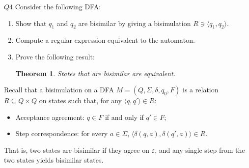 \documentclass{article}
\newtheorem*{theorem*}{Theorem}
\theoremstyle{definition}
\theoremstyle{definition}
\theoremstyle{remark}
\begin{document}
\begin{questionbox}{$Q4$}
    Consider the following DFA:
    \begin{center}
    \end{center}

    \begin{enumerate}
        \item[$(i)$] Show that $q_1$ and $q_2$ are bisimilar by giving a bisimulation $R\ni\langle q_1,q_2\rangle$.
        
        \item[$(ii)$] Compute a regular expression equivalent to the automaton.
        
        \item[$(iii)$] Prove the following result:
        \begin{theorem*}
            States that are bisimilar are equivalent.
        \end{theorem*}
    \end{enumerate}
\end{questionbox}

\bigskip



Recall that a bisimulation on a DFA $M=(Q,\Sigma,\delta,q_0,F)$ is a relation $R\subseteq Q\times Q$ on states such that, for any $\langle q,q'\rangle\in R$:
\begin{itemize}
    \item Acceptance agreement: $q\in F$ if and only if $q'\in F$;
    
    \item Step correspondence: for every $a\in\Sigma$, $\bigl\langle\delta(q,a),\delta(q',a)\bigr\rangle\in R$.
\end{itemize}
That is, two states are bisimilar if they agree on $\varepsilon$, and any single step from the two states yields bisimilar states.
\end{document}
